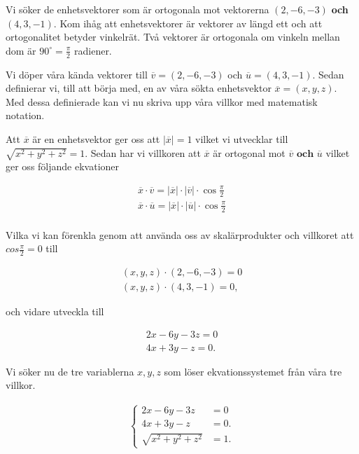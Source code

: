\documentclass[../../main.tex]{subfiles}
\begin{document}
\begin{solution}{5}

Vi söker de enhetsvektorer som är ortogonala mot vektorerna $(2,-6,-3)$ \textbf{och}  $(4,3,-1)$. Kom ihåg att enhetsvektorer är vektorer av längd ett och att ortogonalitet betyder vinkelrät. Två vektorer är ortogonala om vinkeln mellan dom är $90^\circ=\frac{\pi}{2}$ radiener. 

Vi döper våra kända vektorer till $\overline{v}=(2,-6,-3)$ och $\overline{u}=(4,3,-1)$. Sedan definierar vi, till att börja med, en av våra sökta enhetsvektor $\overline{x}=(x,y,z)$. Med dessa definierade kan vi nu skriva upp våra villkor med matematisk notation. 

\bigskip

Att $\overline{x}$ är en enhetsvektor ger oss att $|\overline{x}|=1$  vilket vi utvecklar till $\sqrt{x^2+y^2+z^2}=1$. 
Sedan har vi villkoren att $\overline{x}$ är ortogonal mot $\overline{v} \textbf{ och } \overline{u}$ vilket ger oss följande ekvationer 

\begin{align*}
    \overline{x}\cdot\overline{v}=|\overline{x}|\cdot|\overline{v}|\cdot\cos{\frac{\pi}{2}} \\
    \overline{x}\cdot\overline{u}=|\overline{x}|\cdot|\overline{u}|\cdot \cos{\frac{\pi}{2}} \\
\end{align*}

Vilka vi kan förenkla genom att använda oss av skalärprodukter och villkoret att $cos\frac{\pi}{2}=0$ till

\begin{align*}
     (x,y,z)\cdot(2,-6,-3)=0  \\
    (x,y,z)\cdot(4,3,-1)=0,
\end{align*}

och vidare utveckla till

\begin{align*}
     2x-6y-3z=0  \\
    4x+3y-z=0.
\end{align*}

Vi söker nu de tre variablerna $x,y,z$ som löser ekvationssystemet från våra tre villkor.
  
\begin{align*}
    \begin{cases} 
     2x-6y-3z&=0  \\
    4x+3y-z&=0.   \\
    \sqrt{x^2+y^2+z^2}&=1.
    \end{cases}
\end{align*}


\end{solution}
\end{document}
